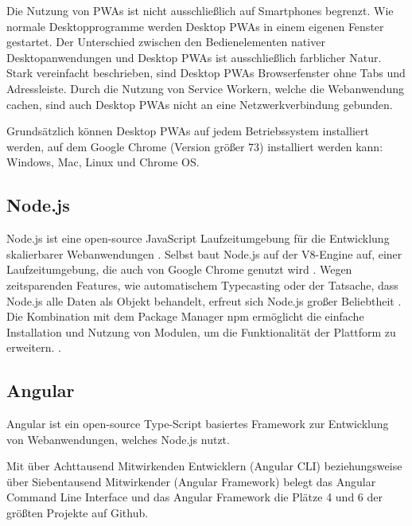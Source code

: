 Die Nutzung von PWAs ist nicht ausschließlich auf Smartphones begrenzt. Wie normale Desktopprogramme werden Desktop PWAs in einem eigenen Fenster gestartet. 
Der Unterschied zwischen den Bedienelementen nativer Desktopanwendungen und Desktop PWAs ist ausschließlich farblicher Natur. Stark vereinfacht beschrieben, sind Desktop PWAs Browserfenster ohne Tabs und Adressleiste. Durch die Nutzung von Service Workern, welche die Webanwendung cachen, sind auch Desktop PWAs nicht an eine Netzwerkverbindung gebunden.

Grundsätzlich können Desktop PWAs auf jedem Betriebssystem installiert werden, auf dem Google Chrome (Version größer 73) installiert werden kann: Windows, Mac, Linux und Chrome OS.
\cite{GooglePWADesktop}



\subsection{Node.js}

Node.js ist eine open-source JavaScript Laufzeitumgebung für die Entwicklung skalierbarer Webanwendungen 
\cite{NodeJSWebsiteAbout}.
Selbst baut Node.js auf der V8-Engine auf, einer Laufzeitumgebung, die auch von Google Chrome genutzt wird 
\cite[S. 1]{NodeJSRecepies}.
Wegen zeitsparenden Features, wie automatischem Typecasting oder der Tatsache, dass Node.js alle Daten als Objekt behandelt, erfreut sich Node.js großer Beliebtheit 
\cite[S. 12]{PracitalNodeJS}.
Die Kombination mit dem Package Manager npm ermöglicht die einfache Installation und Nutzung von Modulen, um die Funktionalität der Plattform zu erweitern. 
\cite[S. 9]{NodeJSRecepies}.


\subsection{Angular}

Angular ist ein open-source Type-Script basiertes Framework zur Entwicklung von Webanwendungen, welches Node.js nutzt.


Mit über Achttausend Mitwirkenden Entwicklern (Angular CLI) beziehungsweise über Siebentausend Mitwirkender (Angular Framework) belegt das Angular Command Line Interface und das Angular Framework die Plätze 4 und 6 der größten Projekte auf Github. 
\cite{OctoverseGitHubStatistics}


